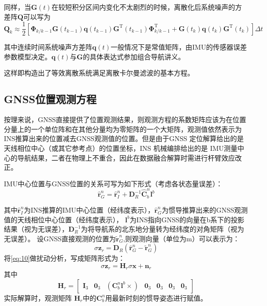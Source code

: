 \documentclass[codepkg=listings,theme=fancy]{course-report}
\begin{document}
同样，当$\bm{G}(t)$在较短积分区间内变化不太剧烈的时候，离散化后系统噪声的方差阵$\bm{Q}$可以写为
\begin{equation}
\mathbf{Q}_{k} \approx \frac{1}{2}\left[\boldsymbol{\Phi}_{k / k-1} \mathbf{G}\left(t_{k-1}\right) \mathbf{q}\left(t_{k-1}\right) \mathbf{G}^{\mathrm{T}}\left(t_{k-1}\right) \boldsymbol{\Phi}_{k / k-1}^{\mathrm{T}}+\mathbf{G}\left(t_{k}\right) \mathbf{q}\left(t_{k}\right) \mathbf{G}^{\mathrm{T}}\left(t_{k}\right)\right] \Delta t
\label{eq:9}
\end{equation}

其中连续时间系统噪声方差阵$\bm{q}(t)$一般情况下是常值矩阵，由IMU的传感器误差参数模型决定。$\bm{q}(t)$与$\bm{G}$的具体表达式参加组合导航讲义。

这样即构造出了等效离散系统满足离散卡尔曼滤波的基本方程。
\subsection{GNSS位置观测方程}
按理来说，GNSS直接提供了位置观测结果，则观测方程的系数矩阵应该为在位置分量上的一个单位阵和在其他分量均为零矩阵的一个大矩阵，观测值依然表示为INS推算出来的位置减去GNSS观测值的位置。但是由于GNSS 定位解算给出的是天线相位中心（或其它参考点）的位置坐标，INS 机械编排给出的是 IMU测量中心的导航结果，二者在物理上不重合，因此在数据融合解算时需进行杆臂效应改正。

IMU中心位置与GNSS位置的关系可写为如下形式（考虑各状态量误差）：
\begin{equation}
\hat{\boldsymbol{r}}_{G}^{n}=\hat{\boldsymbol{r}}_{I}^{n}+\mathbf{D}_{R}^{-1} \hat{\mathbf{C}}_{b}^{n} \boldsymbol{l}^{b}
\label{eq:10}
\end{equation}

其中$\hat{\bm{r}}^n_I$为INS推算的IMU中心位置（经纬度表示），$\hat{\boldsymbol{r}}_{G}^{n}$为惯导推算出来的GNSS观测值的天线相位中心位置（经纬度表示），
$\bm{l}^b$为INS指向GNSS的向量在b系下的投影结果（视为无误差），$\bm{D}^{-1}_R$为将导航系的北东地分量转为经纬度的对角矩阵（视为无误差）。
设GNSS直接观测的位置为$\tilde{\bm{r}}^n_G$,则观测向量（单位为m）可以表示为：
\begin{equation}
\sigma \bm{z}_r=\bm{D}_R(\hat{\bm{r}}^n_G-\tilde{\bm{r}}^n_G)
\end{equation}
将\eqref{eq:10}做扰动分析，写成矩阵形式为：
\begin{equation}
\sigma \bm{z}_r=\bm{H}_r\sigma\bm{x}+\bm{n}_r
\end{equation}
其中
\begin{equation}
\bm{H}_r=\begin{bmatrix}
\bm{I}_3&\bm{0}_3&(\bm{C}^n_b\bm{l}^b\times)&\bm{0}_3&\bm{0}_3&\bm{0}_3&\bm{0}_3
\end{bmatrix}
\end{equation}
实际解算时，观测矩阵 $\bm{H}_r $中的$\bm{C}^n_b$用最新时刻的惯导姿态进行赋值。
\end{document}
